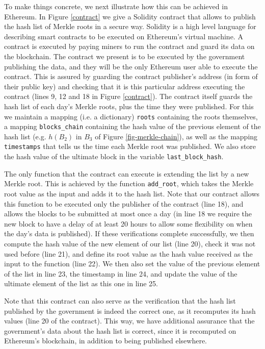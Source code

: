 To make things concrete, we next illustrate how this can be achieved in Ethereum. In Figure \ref{contract} we give a Solidity contract that allows to publish the hash list of Merkle roots in a secure way. Solidity \cite{Solidity} is a high level language for describing smart contracts to be executed on Ethereum's virtual machine. A contract is executed by paying miners to run the contract and guard its data on the blockchain. The contract we present is to be executed by the government publishing the data, and they will be the only Ethereum user able to execute the contract. This is assured by guarding the contract publisher's address (in form of their public key) and checking that it is this particular address executing the contract (lines 9, 12 and 18 in Figure \ref{contract}). The contract itself guards the hash list of each day's Merkle roots, plus the time they were published. For this we maintain a mapping (i.e. a dictionary) \texttt{roots} containing the roots themselves, a mapping \texttt{blocks\_chain} containing the hash value of the previous element of the hash list (e.g. $h(B_2)$ in $B_3$ of Figure \ref{fig-merkle-chain}), as well as the mapping \texttt{timestamps} that tells us the time each Merkle root was published. We also store the hash value of the ultimate block in the variable \texttt{last\_block\_hash}.

The only function that the contract can execute is extending the list by a new Merkle root. This is achieved by the function \texttt{add\_root}, which takes the Merkle root value as the input and adds it to the hash list. Note that our contract allows this function to be executed only the publisher of the contract (line 18), and allows the blocks to be submitted at most once a day (in line 18 we require the new block to have a delay of at least 20 hours to allow some flexibility on when the day's data is published). If these verifications complete successfully, we then compute the hash value of the new element of our list (line 20), check it was not used before (line 21), and define its root value as the hash value received as the input to the function (line 22). We then also set the value of the previous element of the list in line 23, the timestamp in line 24, and update the value of the ultimate element of the list as this one in line 25.

Note that this contract can also serve as the verification that the hash list published by the government is indeed the correct one, as it recomputes its hash values (line 20 of the contract). This way, we have additional assurance that the government's data about the hash list is correct, since it is recomputed on Ethereum's blockchain, in addition to being published elsewhere.

